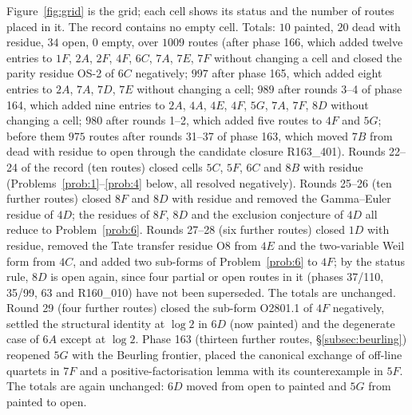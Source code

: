 \documentclass[11pt]{amsart}
\theoremstyle{definition}
\theoremstyle{remark}
\begin{document}
Figure~\ref{fig:grid} is the grid; each cell shows its status and the number of routes placed in it.
The record contains no empty cell. Totals: $10$ painted, $20$ dead with residue, $34$ open, $0$ empty, over $1009$ routes (after phase 166, which added twelve entries to $1F$, $2A$, $2F$, $4F$, $6C$, $7A$, $7E$, $7F$ without changing a cell and closed the parity residue OS-2 of $6C$ negatively; $997$ after phase 165, which added eight entries to $2A$, $7A$, $7D$, $7E$ without changing a cell; $989$ after rounds 3--4 of phase 164, which added nine entries to $2A$, $4A$, $4E$, $4F$, $5G$, $7A$, $7F$, $8D$ without changing a cell; $980$ after rounds 1--2, which added five routes to $4F$ and $5G$; before them $975$ routes after rounds 31--37 of phase 163, which moved $7B$ from dead with residue to open through the candidate closure R163\_401). Rounds 22--24 of the record (ten routes) closed cells $5C$, $5F$, $6C$ and $8B$ with residue (Problems~\ref{prob:1}--\ref{prob:4} below, all resolved negatively). Rounds 25--26 (ten further routes) closed $8F$ and $8D$ with residue and removed the Gamma--Euler residue of $4D$; the residues of $8F$, $8D$ and the exclusion conjecture of $4D$ all reduce to Problem~\ref{prob:6}. Rounds 27--28 (six further routes) closed $1D$ with residue, removed the Tate transfer residue O8 from $4E$ and the two-variable Weil form from $4C$, and added two sub-forms of Problem~\ref{prob:6} to $4F$; by the status rule, $8D$ is open again, since four partial or open routes in it (phases 37/110, 35/99, 63 and R160\_010) have not been superseded. The totals are unchanged. Round 29 (four further routes) closed the sub-form O2801.1 of $4F$ negatively, settled the structural identity at $\log2$ in $6D$ (now painted) and the degenerate case of $6A$ except at $\log2$. Phase 163 (thirteen further routes, \S\ref{subsec:beurling}) reopened $5G$ with the Beurling frontier, placed the canonical exchange of off-line quartets in $7F$ and a positive-factorisation lemma with its counterexample in $5F$. The totals are again unchanged: $6D$ moved from open to painted and $5G$ from painted to open.
\end{document}
